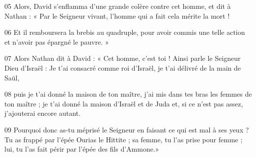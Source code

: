 
05 Alors, David s’enflamma d’une grande colère contre cet homme, et dit à Nathan : « Par le Seigneur vivant, l’homme qui a fait cela mérite la mort !

06 Et il remboursera la brebis au quadruple, pour avoir commis une telle action et n’avoir pas épargné le pauvre. »

07 Alors Nathan dit à David : « Cet homme, c’est toi ! Ainsi parle le Seigneur Dieu d’Israël : Je t’ai consacré comme roi d’Israël, je t’ai délivré de la main de Saül,

08 puis je t’ai donné la maison de ton maître, j’ai mis dans tes bras les femmes de ton maître ; je t’ai donné la maison d’Israël et de Juda et, si ce n’est pas assez, j’ajouterai encore autant.

09 Pourquoi donc as-tu méprisé le Seigneur en faisant ce qui est mal à ses yeux ? Tu as frappé par l’épée Ourias le Hittite ; sa femme, tu l’as prise pour femme ; lui, tu l’as fait périr par l’épée des fils d’Ammone.»
